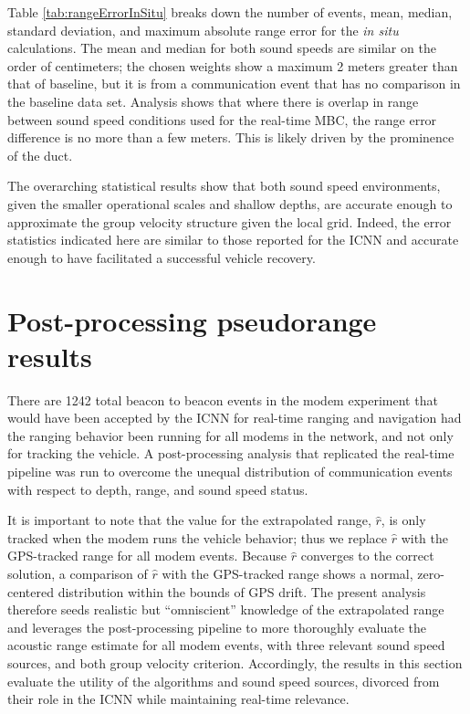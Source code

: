 Table \ref{tab:rangeErrorInSitu} breaks down the number of events, mean, median, standard deviation, and maximum absolute range error for the \textit{in situ} calculations.
The mean and median for both sound speeds are similar on the order of centimeters; the chosen weights show a maximum 2 meters greater than that of baseline, but it is from a communication event that has no comparison in the baseline data set.
Analysis shows that where there is overlap in range between sound speed conditions used for the real-time MBC, the range error difference is no more than a few meters.
This is likely driven by the prominence of the duct.

The overarching statistical results show that both sound speed environments, given the smaller operational scales and shallow depths, are accurate enough to approximate the group velocity structure given the local grid.
Indeed, the error statistics indicated here are similar to those reported for the ICNN \citep{randeni_high-resolution_2021} and accurate enough to have facilitated a successful vehicle recovery.

\FloatBarrier
\section{\label{sec:postprocess} Post-processing pseudorange results}

There are 1242 total beacon to beacon events in the modem experiment that would have been accepted by the ICNN for real-time ranging and navigation had the ranging behavior been running for all modems in the network, and not only for tracking the vehicle.
A post-processing analysis that replicated the real-time pipeline was run to overcome the unequal distribution of communication events with respect to depth, range, and sound speed status.

It is important to note that the value for the extrapolated range, $\hat{r}$, is only tracked when the modem runs the vehicle behavior; thus we replace $\hat{r}$ with the GPS-tracked range for all modem events.
Because $\hat{r}$ converges to the correct solution, a comparison of $\hat{r}$ with the GPS-tracked range shows a normal, zero-centered distribution within the bounds of GPS drift.
The present analysis therefore seeds realistic but ``omniscient'' knowledge of the extrapolated range and leverages the post-processing pipeline to more thoroughly evaluate the acoustic range estimate for all modem events, with three relevant sound speed sources, and both group velocity criterion.
Accordingly, the results in this section evaluate the utility of the algorithms and sound speed sources, divorced from their role in the ICNN while maintaining real-time relevance.

